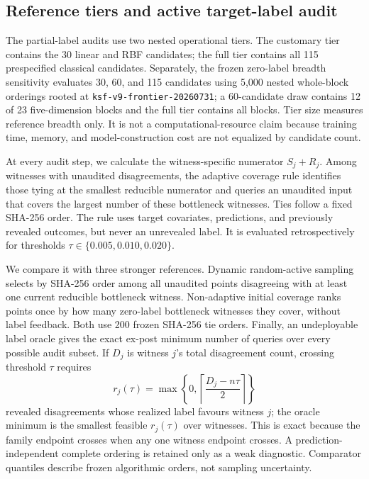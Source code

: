 \documentclass[referee,lineno,pdflatex,sn-nature]{sn-jnl}
\theoremstyle{thmstyleone}%
\theoremstyle{thmstyletwo}%
\theoremstyle{thmstylethree}%
\begin{document}
\subsection{Reference tiers and active target-label audit}
\label{sec:methods_frontier}

The partial-label audits use two nested operational tiers. The customary tier contains the 30 linear and RBF candidates; the full tier contains all 115 prespecified classical candidates. Separately, the frozen zero-label breadth sensitivity evaluates 30, 60, and 115 candidates using 5,000 nested whole-block orderings rooted at \texttt{ksf-v9-frontier-20260731}; a 60-candidate draw contains 12 of 23 five-dimension blocks and the full tier contains all blocks. Tier size measures reference breadth only. It is not a computational-resource claim because training time, memory, and model-construction cost are not equalized by candidate count.

At every audit step, we calculate the witness-specific numerator $S_j+R_j$. Among witnesses with unaudited disagreements, the adaptive coverage rule identifies those tying at the smallest reducible numerator and queries an unaudited input that covers the largest number of these bottleneck witnesses. Ties follow a fixed SHA-256 order. The rule uses target covariates, predictions, and previously revealed outcomes, but never an unrevealed label. It is evaluated retrospectively for thresholds $\tau\in\{0.005,0.010,0.020\}$.

We compare it with three stronger references. Dynamic random-active sampling selects by SHA-256 order among all unaudited points disagreeing with at least one current reducible bottleneck witness. Non-adaptive initial coverage ranks points once by how many zero-label bottleneck witnesses they cover, without label feedback. Both use 200 frozen SHA-256 tie orders. Finally, an undeployable label oracle gives the exact ex-post minimum number of queries over every possible audit subset. If $D_j$ is witness $j$'s total disagreement count, crossing threshold $\tau$ requires
\[
r_j(\tau)=\max\!\left\{0,\left\lceil\frac{D_j-n\tau}{2}\right\rceil\right\}
\]
revealed disagreements whose realized label favours witness $j$; the oracle minimum is the smallest feasible $r_j(\tau)$ over witnesses. This is exact because the family endpoint crosses when any one witness endpoint crosses. A prediction-independent complete ordering is retained only as a weak diagnostic. Comparator quantiles describe frozen algorithmic orders, not sampling uncertainty.
\end{document}
